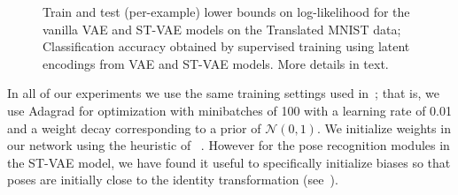 \begin{figure}[t]
\begin{center}
\vspace{-3mm}
\end{center}
 \caption{\footnotesize
  Train and test (per-example) lower bounds on log-likelihood 
for the vanilla VAE and ST-VAE models on the Translated MNIST data;
  Classification accuracy obtained by supervised training using latent encodings
 from VAE and ST-VAE models.  More details in text.
 }
\end{figure}


In all of our experiments we use the same training settings used in~\cite{Kingma2014}; that is,  
we use Adagrad for optimization with minibatches of 100  with a learning rate of 0.01
and a weight decay corresponding to a prior of $\mathcal{N}(0,1)$.
We initialize weights in our network using the heuristic of ~\cite{glorot2010understanding}.
However for the pose recognition modules in the ST-VAE model, we have found it useful to
specifically initialize biases so that poses are initially close to the identity transformation (see~\cite{jaderberg2015spatial}).

